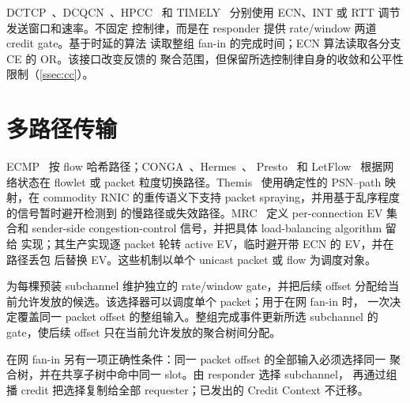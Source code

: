 DCTCP~\cite{dctcp}、DCQCN~\cite{dcqcn}、HPCC~\cite{hpcc} 和 TIMELY~
\cite{timely} 分别使用 ECN、INT 或 RTT 调节发送窗口和速率。\sysname 不固定
控制律，而是在 responder 提供 rate/window 两道 credit gate。基于时延的算法
读取整组 fan-in 的完成时间；ECN 算法读取各分支 CE 的 OR。该接口改变反馈的
聚合范围，但保留所选控制律自身的收敛和公平性限制（\cref{ssec:cc}）。

\section{多路径传输}

ECMP~\cite{ecmp} 按 flow 哈希路径；CONGA~\cite{conga}、Hermes~\cite{hermes}、
Presto~\cite{presto} 和 LetFlow~\cite{letflow} 根据网络状态在 flowlet 或 packet
粒度切换路径。Themis~\cite{themis} 使用确定性的 PSN--path 映射，在 commodity
RNIC 的重传语义下支持 packet spraying，并用基于乱序程度的信号暂时避开检测到
的慢路径或失效路径。MRC~\cite{mrc,mrcsrv6} 定义 per-connection EV 集合和
sender-side congestion-control 信号，并把具体 load-balancing algorithm 留给
实现；其生产实现逐 packet 轮转 active EV，临时避开带 ECN 的 EV，并在路径丢包
后替换 EV。这些机制以单个 unicast packet 或 flow 为调度对象。

\sysname 为每棵预装 subchannel 维护独立的 rate/window gate，并把后续 offset
分配给当前允许发放的候选。该选择器可以调度单个 packet；用于在网 fan-in 时，
一次决定覆盖同一 packet offset 的整组输入。整组完成事件更新所选 subchannel
的 gate，使后续 offset 只在当前允许发放的聚合树间分配。

在网 fan-in 另有一项正确性条件：同一 packet offset 的全部输入必须选择同一
聚合树，并在共享子树中命中同一 slot。\sysname 由 responder 选择 subchannel，
再通过组播 credit 把选择复制给全部 requester；已发出的 Credit Context 不迁移。
